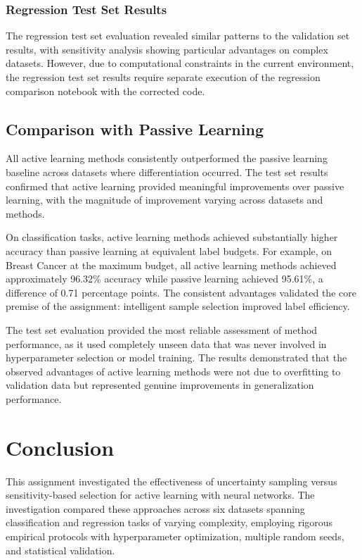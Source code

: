 \documentclass[conference]{IEEEtran}
\begin{document}
\subsubsection{Regression Test Set Results}

The regression test set evaluation revealed similar patterns to the validation set results, with sensitivity analysis showing particular advantages on complex datasets. However, due to computational constraints in the current environment, the regression test set results require separate execution of the regression comparison notebook with the corrected code.

\subsection{Comparison with Passive Learning}

All active learning methods consistently outperformed the passive learning baseline across datasets where differentiation occurred. The test set results confirmed that active learning provided meaningful improvements over passive learning, with the magnitude of improvement varying across datasets and methods.

On classification tasks, active learning methods achieved substantially higher accuracy than passive learning at equivalent label budgets. For example, on Breast Cancer at the maximum budget, all active learning methods achieved approximately 96.32\% accuracy while passive learning achieved 95.61\%, a difference of 0.71 percentage points. The consistent advantages validated the core premise of the assignment: intelligent sample selection improved label efficiency.

The test set evaluation provided the most reliable assessment of method performance, as it used completely unseen data that was never involved in hyperparameter selection or model training. The results demonstrated that the observed advantages of active learning methods were not due to overfitting to validation data but represented genuine improvements in generalization performance.

\section{Conclusion}

This assignment investigated the effectiveness of uncertainty sampling versus sensitivity-based selection for active learning with neural networks. The investigation compared these approaches across six datasets spanning classification and regression tasks of varying complexity, employing rigorous empirical protocols with hyperparameter optimization, multiple random seeds, and statistical validation.
\end{document}
